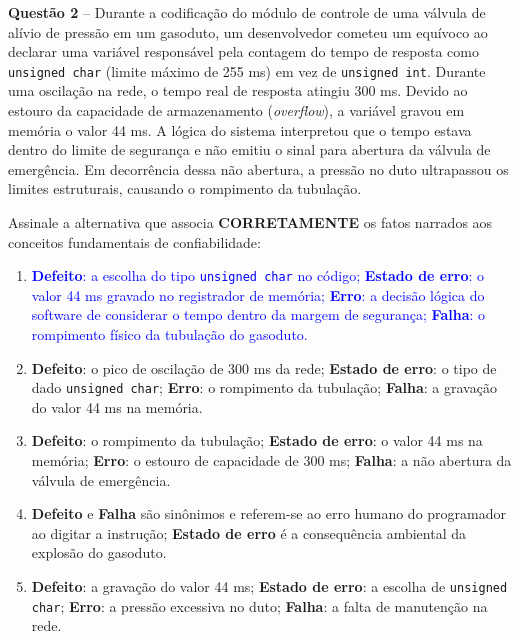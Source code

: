 \documentclass[12pt,a4paper]{article}
\begin{document}
\vspace{0.5cm}

\textbf{Questão 2} -- Durante a codificação do módulo de controle de uma válvula de alívio de pressão em um gasoduto, um desenvolvedor cometeu um equívoco ao declarar uma variável responsável pela contagem do tempo de resposta como \texttt{unsigned char} (limite máximo de 255 ms) em vez de \texttt{unsigned int}. Durante uma oscilação na rede, o tempo real de resposta atingiu 300 ms. Devido ao estouro da capacidade de armazenamento (\textit{overflow}), a variável gravou em memória o valor 44 ms. A lógica do sistema interpretou que o tempo estava dentro do limite de segurança e não emitiu o sinal para abertura da válvula de emergência. Em decorrência dessa não abertura, a pressão no duto ultrapassou os limites estruturais, causando o rompimento da tubulação.

\vspace{0.2cm}

Assinale a alternativa que associa \textbf{CORRETAMENTE} os fatos narrados aos conceitos fundamentais de confiabilidade:

\vspace{0.3cm}

\begin{enumerate}[label=\textbf{(\Alph*)}]
    \item[\textcolor{blue}{\textbf{(A)}}] \textcolor{blue}{\textbf{Defeito}: a escolha do tipo \texttt{unsigned char} no código; \textbf{Estado de erro}: o valor 44 ms gravado no registrador de memória; \textbf{Erro}: a decisão lógica do software de considerar o tempo dentro da margem de segurança; \textbf{Falha}: o rompimento físico da tubulação do gasoduto.}
    
    \item \textbf{Defeito}: o pico de oscilação de 300 ms da rede; \textbf{Estado de erro}: o tipo de dado \texttt{unsigned char}; \textbf{Erro}: o rompimento da tubulação; \textbf{Falha}: a gravação do valor 44 ms na memória.
    
    \item \textbf{Defeito}: o rompimento da tubulação; \textbf{Estado de erro}: o valor 44 ms na memória; \textbf{Erro}: o estouro de capacidade de 300 ms; \textbf{Falha}: a não abertura da válvula de emergência.
    
    \item \textbf{Defeito} e \textbf{Falha} são sinônimos e referem-se ao erro humano do programador ao digitar a instrução; \textbf{Estado de erro} é a consequência ambiental da explosão do gasoduto.
    
    \item \textbf{Defeito}: a gravação do valor 44 ms; \textbf{Estado de erro}: a escolha de \texttt{unsigned char}; \textbf{Erro}: a pressão excessiva no duto; \textbf{Falha}: a falta de manutenção na rede.
\end{enumerate}
\end{document}
